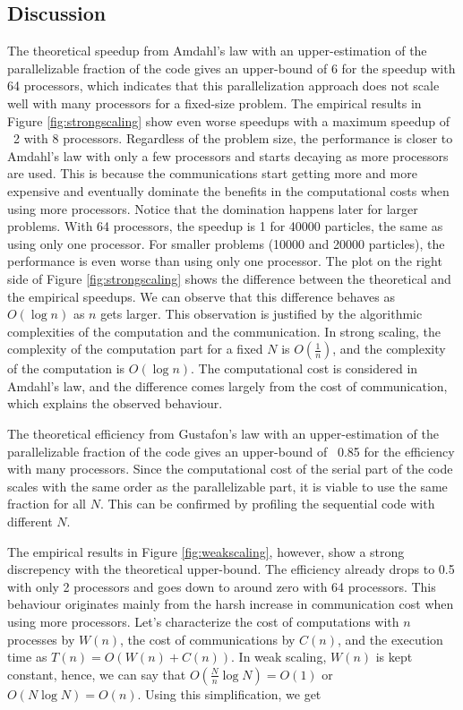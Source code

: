 \documentclass[10pt,journal,compsocconf]{IEEEtran}
\begin{document}
\subsection{Discussion}

The theoretical speedup from Amdahl's law with an upper-estimation of the parallelizable fraction of the code gives an upper-bound of 6 for the speedup with 64 processors, which indicates that this parallelization approach does not scale well with many processors for a fixed-size problem. The empirical results in Figure \ref{fig:strongscaling} show even worse speedups with a maximum speedup of ~2 with 8 processors. Regardless of the problem size, the performance is closer to Amdahl's law with only a few processors and starts decaying as more processors are used. This is because the communications start getting more and more expensive and eventually dominate the benefits in the computational costs when using more processors. Notice that the domination happens later for larger problems. With 64 processors, the speedup is 1 for 40000 particles, the same as using only one processor. For smaller problems (10000 and 20000 particles), the performance is even worse than using only one processor. The plot on the right side of Figure \ref{fig:strongscaling} shows the difference between the theoretical and the empirical speedups. We can observe that this difference behaves as $O(\log n)$ as $n$ gets larger. This observation is justified by the algorithmic complexities of the computation and the communication. In strong scaling, the complexity of the computation part for a fixed $N$ is $O(\frac{1}{n})$, and the complexity of the computation is $O(\log n)$. The computational cost is considered in Amdahl's law, and the difference comes largely from the cost of communication, which explains the observed behaviour.

The theoretical efficiency from Gustafon's law with an upper-estimation of the parallelizable fraction of the code gives an upper-bound of ~0.85 for the efficiency with many processors. Since the computational cost of the serial part of the code scales with the same order as the parallelizable part, it is viable to use the same fraction for all $N$. This can be confirmed by profiling the sequential code with different $N$.

The empirical results in Figure \ref{fig:weakscaling}, however, show a strong discrepency with the theoretical upper-bound. The efficiency already drops to 0.5 with only 2 processors and goes down to around zero with 64 processors. This behaviour originates mainly from the harsh increase in communication cost when using more processors. Let's characterize the cost of computations with $n$ processes by $W(n)$, the cost of communications by $C(n)$, and the execution time as $T(n) = O(W(n) + C(n))$. In weak scaling, $W(n)$ is kept constant, hence, we can say that $O(\frac{N}{n} \log N) = O(1)$ or $O(N \log N) = O(n)$. Using this simplification, we get
\end{document}

